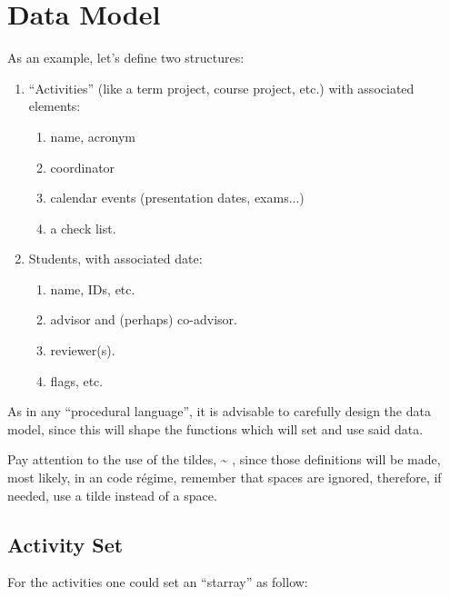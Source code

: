 \documentclass[10pt]{article}
\begin{document}
\section{Data Model}\label{DataModel}
As an example, let's define two structures:
\begin{enumerate}
  \item ``Activities'' (like a term project, course project, etc.)  with associated 
elements: 
\begin{enumerate}
  \item name, acronym
  \item coordinator
  \item calendar events (presentation dates, exams...)
  \item a check list.
\end{enumerate}

  \item Students, with associated date:
\begin{enumerate}
  \item name, IDs, etc.
  \item advisor and (perhaps) co-advisor.
  \item reviewer(s).
  \item flags, etc.
\end{enumerate}
  
  
\end{enumerate}

\begin{tsremark}
As in any ``procedural language'', it is advisable to  carefully design the data model, since this will shape the functions which will set and use said data.
\end{tsremark}

\begin{tsremark}
  Pay attention to the use of the tildes,  \~{} , since those definitions will be made, most likely, in an  code régime, remember that spaces are ignored, therefore, if needed, use a tilde instead of a space.
\end{tsremark}


\subsection{Activity Set}\label{Activity:DataModel}
For the activities one could set an ``starray'' as follow:
\end{document}
